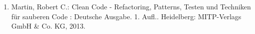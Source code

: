 \documentclass[10pt,a4paper,bibliography=totocnumbered,listof=totocnumbered]{scrartcl}
\begin{document}






\renewcommand\refname{Quellenverzeichnis}


\vspace{10px}
\begin{enumerate}
	

	\item Martin, Robert C.: Clean Code - Refactoring, Patterns, Testen und Techniken für sauberen Code : Deutsche Ausgabe. 1. Aufl.. Heidelberg: MITP-Verlags GmbH \& Co. KG, 2013.

\end{enumerate}


\pagebreak

\end{document}
